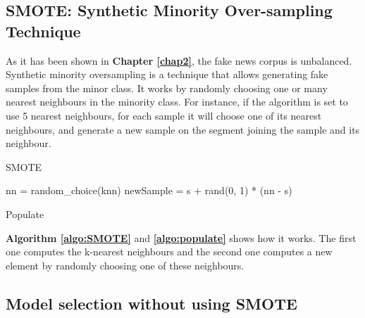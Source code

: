 \subsection{SMOTE: Synthetic Minority Over-sampling Technique\cite{Chawla2011}}
As it has been shown in \textbf{Chapter \ref{chap2}}, the fake news corpus is unbalanced. Synthetic minority oversampling is a technique that allows generating fake samples from the minor class. It works by randomly choosing one or many nearest neighbours in the minority class. For instance, if the algorithm is set to use 5 nearest neighbours, for each sample it will choose one of its nearest neighbours, and generate a new sample on the segment joining the sample and its neighbour. 
\begin{algorithm}
  \caption{SMOTE}
  \label{algo:SMOTE}
\end{algorithm}
\begin{algorithm}
 nn = random\_choice(knn)\;
 newSample = s + rand(0, 1) * (nn - s)\;
 \caption{Populate}
 \label{algo:populate}
\end{algorithm}
\textbf{Algorithm \ref{algo:SMOTE}} and \textbf{\ref{algo:populate}} shows how it works. The first one computes the k-nearest neighbours and the second one computes a new element by randomly choosing one of these neighbours. 
\subsection{Model selection without using SMOTE}
